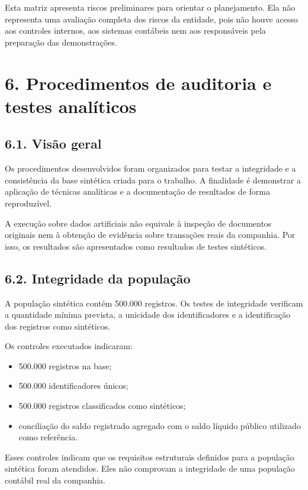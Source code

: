 \documentclass[
]{article}
\providecommand{\tightlist}{%
  \setlength{\itemsep}{0pt}\setlength{\parskip}{0pt}}
\begin{document}
Esta matriz apresenta riscos preliminares para orientar o planejamento.
Ela não representa uma avaliação completa dos riscos da entidade, pois
não houve acesso aos controles internos, aos sistemas contábeis nem aos
responsáveis pela preparação das demonstrações.

\section{6. Procedimentos de auditoria e testes
analíticos}\label{procedimentos-de-auditoria-e-testes-analuxedticos}

\subsection{6.1. Visão geral}\label{visuxe3o-geral}

Os procedimentos desenvolvidos foram organizados para testar a
integridade e a consistência da base sintética criada para o trabalho. A
finalidade é demonstrar a aplicação de técnicas analíticas e a
documentação de resultados de forma reproduzível.

A execução sobre dados artificiais não equivale à inspeção de documentos
originais nem à obtenção de evidência sobre transações reais da
companhia. Por isso, os resultados são apresentados como resultados de
testes sintéticos.

\subsection{6.2. Integridade da
população}\label{integridade-da-populauxe7uxe3o}

A população sintética contém 500.000 registros. Os testes de integridade
verificam a quantidade mínima prevista, a unicidade dos identificadores
e a identificação dos registros como sintéticos.

Os controles executados indicaram:

\begin{itemize}
\tightlist
\item
  500.000 registros na base;
\item
  500.000 identificadores únicos;
\item
  500.000 registros classificados como sintéticos;
\item
  conciliação do saldo registrado agregado com o saldo líquido público
  utilizado como referência.
\end{itemize}

Esses controles indicam que os requisitos estruturais definidos para a
população sintética foram atendidos. Eles não comprovam a integridade de
uma população contábil real da companhia.
\end{document}
